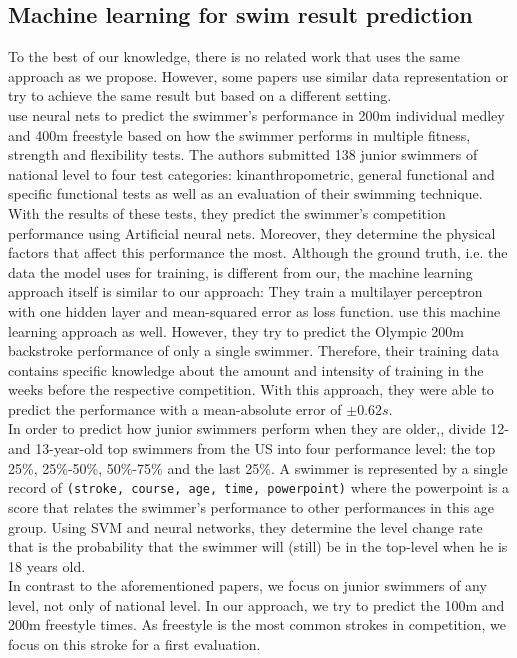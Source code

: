 \subsection{Machine learning for swim result prediction}
To the best of our knowledge, there is no related work that uses the same approach as we propose. However, some papers use similar data representation or try to achieve the same result but based on a different setting.\\
\citet{Silva.2007} use neural nets to predict the swimmer’s performance in 200m individual medley and 400m freestyle based on how the swimmer performs in multiple fitness, strength and flexibility tests. The authors submitted 138 junior swimmers of national level to four test categories: kinanthropometric, general functional and specific functional tests as well as an evaluation of their swimming technique. With the results of these tests, they predict the swimmer’s competition performance using Artificial neural nets. Moreover, they determine the physical factors that affect this performance the most. Although the ground truth, i.e. the data the model uses for training, is different from our, the machine learning approach itself is similar to our approach: They train a multilayer perceptron with one hidden layer and mean-squared error as loss function. \citet{EdelmannNusser.2002} use this machine learning approach as well. However, they try to predict the Olympic 200m backstroke performance of only a single swimmer. Therefore, their training data contains specific knowledge about the amount and intensity of training in the weeks before the respective competition. With this approach, they were able to predict the performance with a mean-absolute error of $\pm 0.62s$.\\
In order to predict how junior swimmers perform when they are older,, \citet{Xie.2015} divide 12- and 13-year-old top swimmers from the US into four performance level: the top 25\%, 25\%-50\%, 50\%-75\% and the last 25\%. A swimmer is represented by a single record of \texttt{(stroke, course, age, time, powerpoint)} where the powerpoint is a score that relates the swimmer's performance to other performances in this age group. Using SVM and neural networks, they determine the level change rate that is the probability that the swimmer will (still) be in the top-level when he is 18 years old. \\
In contrast to the aforementioned papers, we focus on junior swimmers of any level, not only of national level. In our approach, we try to predict the 100m and 200m freestyle times. As freestyle is the most common strokes in competition, we focus on this stroke for a first evaluation.